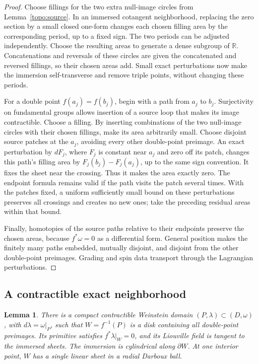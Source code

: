 \documentclass[11pt]{article}
\numberwithin{equation}{section}
\newtheorem{lemma}[theorem]{Lemma}
\theoremstyle{definition}
\theoremstyle{remark}
\begin{document}
\begin{proof}
Choose fillings for the two extra null-image circles from
Lemma~\ref{topo:source}.  In an immersed cotangent neighborhood,
replacing the zero section by a small closed one-form changes each
chosen filling area by the corresponding period, up to a fixed
sign.  The two periods can be adjusted independently.  Choose
the resulting areas to generate a dense subgroup of $\mathbb R$.
Concatenations and reversals of these circles are given the
concatenated and reversed fillings, so their chosen areas add.
Small exact perturbations now make the immersion self-transverse
and remove triple points, without changing these periods.

For a double point $f(a_j)=f(b_j)$, begin with a path from $a_j$
to $b_j$.  Surjectivity on fundamental groups allows insertion of
a source loop that makes its image contractible.  Choose a filling.
By inserting combinations of the two null-image circles with their
chosen fillings, make its area arbitrarily small.  Choose disjoint
source patches at the $a_j$, avoiding every other double-point
preimage.  An exact perturbation by $dF_j$, where $F_j$ is constant
near $a_j$ and zero off its patch, changes this path's filling area
by $F_j(b_j)-F_j(a_j)$, up to the same sign convention.  It fixes
the sheet near the crossing.  Thus it makes the area exactly zero.
The endpoint formula remains valid if the path visits the patch
several times.  With the patches fixed, a uniform sufficiently
small bound on these perturbations preserves all crossings and
creates no new ones; take the preceding residual areas within that
bound.

Finally, homotopies of the source paths relative to their endpoints
preserve the chosen areas, because $f^*\omega=0$ as a differential
form.  General position makes the finitely many paths embedded,
mutually disjoint, and disjoint from the other double-point
preimages.  Grading and spin data transport through the
Lagrangian perturbations.
\end{proof}

\subsection{A contractible exact neighborhood}

\begin{lemma}\label{topo:exact-domain}
There is a compact contractible Weinstein domain
$(P,\lambda)\subset(D,\omega)$, with $d\lambda=\omega|_P$, such that
$W=f^{-1}(P)$ is a disk
containing all double-point preimages.  Its primitive satisfies
$f^*\lambda|_W=0$, and its Liouville field is tangent to the
immersed sheets.  The immersion is cylindrical along $\partial W$.
At one interior point, $W$ has a single linear sheet in a radial
Darboux ball.
\end{lemma}
\end{document}
